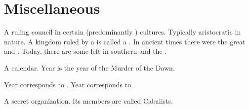 \section{Miscellaneous}
\begin{gloss}



\begin{comment}
\paragraph[Baccon]{\baccon}
\end{comment}
\gitem[\baccons]{\baccon}
\index{\bacconate}
A ruling council in certain (predominantly \scathaese{}) cultures. 
Typically aristocratic in nature. 
A kingdom ruled by a \baccon{} is called a \bacconate{}. 
In ancient times there were the great  and  \Bacconates. 
Today, there are some \bacconates{} left in southern \Velcad{} and the . 







\begin{comment}
\paragraph{Black Dawn calendar}
\end{comment}
A \resphan{} calendar. 
Year  is the year of the Murder of the Dawn. 

Year  corresponds to . 
Year  corresponds to . 







\begin{comment}
\paragraph{The Cabal}
\end{comment}
A secret organization. 
Its members are called Cabalists.








\end{gloss}
